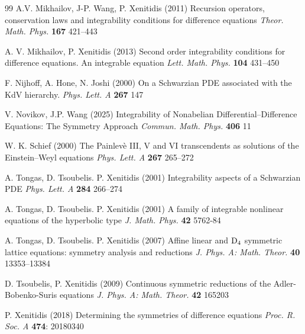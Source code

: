 \documentclass[dvips,10pt]{article}
\theoremstyle{remark} %
\begin{document}
\begin{thebibliography}{99}
		 A.V. Mikhailov, J-P. Wang, P. Xenitidis (2011) Recursion operators, conservation laws and integrability conditions for difference equations {\emph{Theor. Math. Phys.}} {\bf{167}} 421--443
		
		 A. V. Mikhailov, P. Xenitidis (2013) Second order integrability conditions for difference equations. An integrable equation {\emph{Lett. Math. Phys.}} {\bf{104}} 431--450
		
		 F. Nijhoff, A. Hone, N. Joshi (2000) On a Schwarzian PDE associated with the KdV hierarchy. {\emph{Phys. Lett. A}} {\bf{267}} 147
		
		 V. Novikov, J.P. Wang (2025) Integrability of Nonabelian Differential--Difference Equations: The Symmetry Approach {\emph{Commun. Math. Phys.}} {\bf{406}} 11
		
		 W. K. Schief (2000) The Painlev\`{e} III, V and VI transcendents as solutions of the Einstein--Weyl equations  {\emph{Phys. Lett. A}} {\bf{267}} 265--272
		
		 A. Tongas, D. Tsoubelis. P. Xenitidis (2001) Integrability aspects of a Schwarzian PDE  {\it Phys. Lett. A} {\bf 284} 266--274
		
		 A. Tongas, D. Tsoubelis. P. Xenitidis (2001) A family of integrable nonlinear equations of the hyperbolic type {\emph{J. Math. Phys.}} {\bf{42}} 5762-84
		
		 A. Tongas, D. Tsoubelis. P. Xenitidis (2007) Affine linear and $\rm{D}_4$ symmetric lattice equations: symmetry analysis and reductions  {\emph{J. Phys. A: Math. Theor.}} {\bf 40} 13353--13384
		
		 D. Tsoubelis, P. Xenitidis (2009) Continuous symmetric reductions of the Adler-Bobenko-Suris equations {\emph{J. Phys. A: Math. Theor.}} {\bf{42}} 165203
		
		 P. Xenitidis (2018) Determining the symmetries of difference equations {\emph{Proc. R. Soc. A}} {\bf{474}}: 20180340
		
	\end{thebibliography}
	
\end{document}
